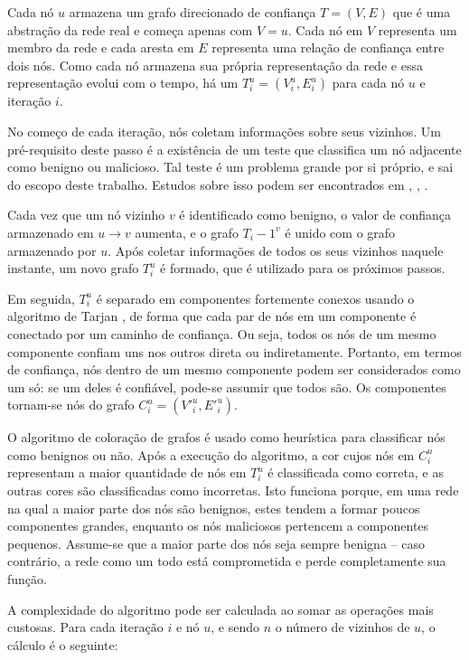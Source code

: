 \begin{resumoextendido}
	Cada nó $u$ armazena um grafo direcionado de confiança $T = (V,E)$ que é uma abstração da rede real e começa apenas com $V = {u}$.
	Cada nó em $V$ representa um membro da rede e cada aresta em $E$ representa uma relação de confiança entre dois nós.
	Como cada nó armazena sua própria representação da rede e essa representação evolui com o tempo, há um $T_i^u = (V_i^u, E_i^u)$ para cada nó $u$ e iteração $i$.
	
	No começo de cada iteração, nós coletam informações sobre seus vizinhos.
	Um pré-requisito deste passo é a existência de um teste que classifica um nó adjacente como benigno ou malicioso.
	Tal teste é um problema grande por si próprio, e sai do escopo deste trabalho.
	Estudos sobre isso podem ser encontrados em \citep{golle2004detecting}, \citep{li2016defective}, \citep{kerrache2016detection}.
	
	Cada vez que um nó vizinho $v$ é identificado como benigno, o valor de confiança armazenado em $u \rightarrow v$ aumenta, e o grafo $T_i-1^v$ é unido com o grafo armazenado por $u$.
	Após coletar informações de todos os seus vizinhos naquele instante, um novo grafo $T_i^u$ é formado, que é utilizado para os próximos passos.
	
	Em seguida, $T_i^u$ é separado em componentes fortemente conexos usando o algoritmo de Tarjan \citep{tarjan1972depth}, de forma que cada par de nós em um componente é conectado por um caminho de confiança.
	Ou seja, todos os nós de um mesmo componente confiam uns nos outros direta ou indiretamente.
	Portanto, em termos de confiança, nós dentro de um mesmo componente podem ser considerados como um só: se um deles é confiável, pode-se assumir que todos são.
	Os componentes tornam-se nós do grafo $C^u_i = (V'^u_i, E'^u_i)$.
	
	O algoritmo de coloração de grafos \citep{mittal2011graph} é usado como heurística para classificar nós como benignos ou não.
	Após a execução do algoritmo, a cor cujos nós em $C_i^u$ representam a maior quantidade de nós em $T_i^u$ é classificada como correta, e as outras cores são classificadas como incorretas.
	Isto funciona porque, em uma rede na qual a maior parte dos nós são benignos, estes tendem a formar poucos componentes grandes, enquanto os nós maliciosos pertencem a componentes pequenos.
	Assume-se que a maior parte dos nós seja sempre benigna -- caso contrário, a rede como um todo está comprometida e perde completamente sua função.
	
	A complexidade do algoritmo pode ser calculada ao somar as operações mais custosas.
	Para cada iteração $i$ e nó $u$, e sendo $n$ o número de vizinhos de $u$, o cálculo é o seguinte:
	

\end{resumoextendido}
